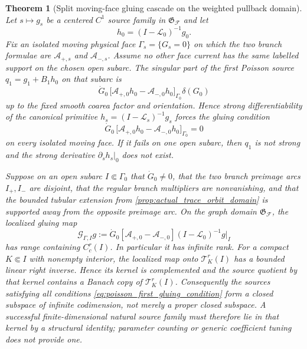 \documentclass[11pt]{amsart}
\theoremstyle{compactplain}
\newtheorem{theorem}{Theorem}[section]
\theoremstyle{compactdefinition}
\theoremstyle{compactremark}
\newcommand{\Ltransfer}{\mathscr L}
\begin{document}
\begin{theorem}[Split moving-face gluing cascade on the weighted pullback domain]
\label{prop:poisson_moving_face_gluing_obstruction}
Let \(s\mapsto g_s\) be a centered \(C^1\) source family in
\(\mathfrak G_{\mathscr F}\) and let
\[
 h_0=(I-\Ltransfer_0)^{-1}g_0.
\]
Fix an isolated moving physical face
\(\Gamma_s=\{G_s=0\}\) on which the two branch formulae are
\(\mathcal A_{+,s}\) and \(\mathcal A_{-,s}\).  Assume no other face current
has the same labelled support on the chosen open subarc.  The singular part
of the first Poisson source \(q_1=g_1+B_1h_0\) on that subarc is
\begin{equation}
\label{eq:poisson_first_gluing_current}
 \dot G_0\,
 \bigl[\mathcal A_{+,0}h_0-\mathcal A_{-,0}h_0\bigr]_{\Gamma_0}
 \delta(G_0)
\end{equation}
up to the fixed smooth coarea factor and orientation.  Hence strong
differentiability of the canonical primitive
\(h_s=(I-\Ltransfer_s)^{-1}g_s\) forces the gluing condition
\begin{equation}
\label{eq:poisson_first_gluing_condition}
 \dot G_0\,
 \bigl[\mathcal A_{+,0}h_0-\mathcal A_{-,0}h_0\bigr]_{\Gamma_0}=0
\end{equation}
on every isolated moving face.  If it fails on one open subarc, then
\(q_1\) is not strong and the strong derivative \(\partial_sh_s|_0\) does not
exist.

Suppose on an open subarc \(I\Subset\Gamma_0\) that
\(\dot G_0\ne0\), that the two branch preimage arcs \(I_+,I_-\) are disjoint,
that the regular branch multipliers are nonvanishing, and that the bounded
tubular extension from \cref{prop:actual_trace_orbit_domain} is supported away
from the opposite preimage arc.  On the graph domain
\(\mathfrak G_{\mathscr F}\), the localized gluing map
\begin{equation}
\label{eq:localized_poisson_gluing_map}
 \mathcal G_{\Gamma,I}g
 :=\dot G_0[\mathcal A_{+,0}-\mathcal A_{-,0}]
 (I-\Ltransfer_0)^{-1}g\big|_I
\end{equation}
has range containing \(C_c^r(I)\).  In particular it has infinite rank.
For a compact \(K\Subset I\) with nonempty interior, the localized map onto
\(\mathcal T_K^r(I)\) has a bounded linear right
inverse.  Hence its kernel is complemented and the source
quotient by that kernel contains a Banach copy of \(\mathcal T_K^r(I)\).
Consequently the sources satisfying all conditions
\eqref{eq:poisson_first_gluing_condition} form a closed subspace of infinite
codimension, not merely a proper closed subspace.  A successful
finite-dimensional natural source family must therefore lie in that kernel by
a structural identity; parameter counting or generic coefficient tuning does
not provide one.


\end{theorem}
\end{document}
